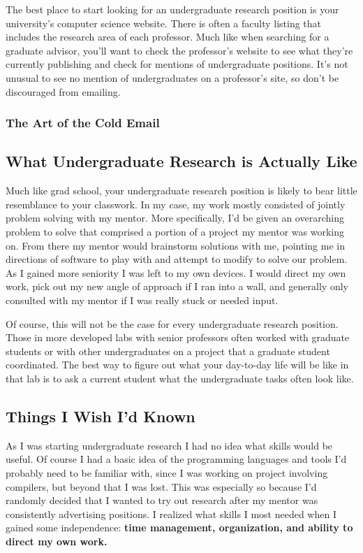 \documentclass[12pt]{article}
\begin{document}
The best place to start looking for an undergraduate research position is your university's computer science website. There is often a faculty listing that includes the research area of each professor. Much like when searching for a graduate advisor, you'll want to check the professor's website to see what they're currently publishing and check for mentions of undergraduate positions. It's not unusual to see no mention of undergraduates on a professor's site, so don't be discouraged from emailing.

\subsubsection{The Art of the Cold Email}

\subsection{What Undergraduate Research is Actually Like}

Much like grad school, your undergraduate research position is likely to bear little resemblance to your classwork. In my case, my work mostly consisted of jointly problem solving with my mentor. More specifically, I'd be given an overarching problem to solve that comprised a portion of a project my mentor was working on. From there my mentor would brainstorm solutions with me, pointing me in directions of software to play with and attempt to modify to solve our problem. As I gained more seniority I was left to my own devices. I would direct my own work, pick out my new angle of approach if I ran into a wall, and generally only consulted with my mentor if I was really stuck or needed input.

Of course, this will not be the case for every undergraduate research position. Those in more developed labs with senior professors often worked with graduate students or with other undergraduates on a project that a graduate student coordinated. The best way to figure out what your day-to-day life will be like in that lab is to ask a current student what the undergraduate tasks often look like.

\subsection{Things I Wish I'd Known}

As I was starting undergraduate research I had no idea what skills would be useful. Of course I had a basic idea of the programming languages and tools I'd probably need to be familiar with, since I was working on project involving compilers, but beyond that I was lost. This was especially so because I'd randomly decided that I wanted to try out research after my mentor was consistently advertising positions. I realized what skills I most needed when I gained some independence: \textbf{time management, organization, and ability to direct my own work.}
\end{document}
